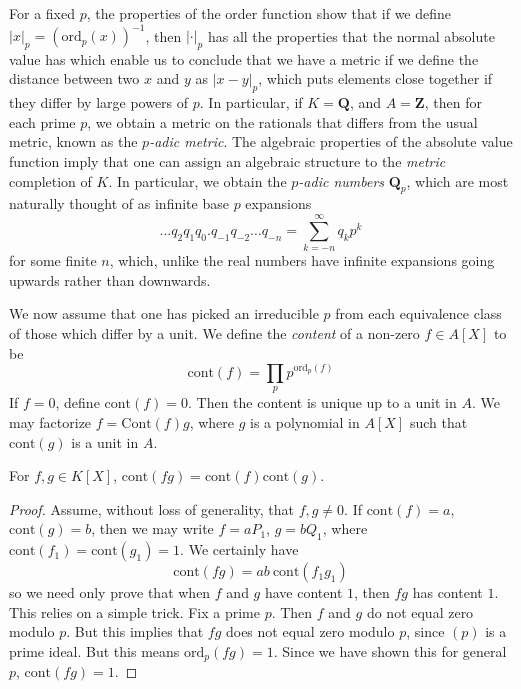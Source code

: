 \begin{remark}
	For a fixed $p$, the properties of the order function show that if we define $|x|_p = (\text{ord}_p(x))^{-1}$, then $|\cdot|_p$ has all the properties that the normal absolute value has which enable us to conclude that we have a metric if we define the distance between two $x$ and $y$ as $|x-y|_p$, which puts elements close together if they differ by large powers of $p$. In particular, if $K = \mathbf{Q}$, and $A = \mathbf{Z}$, then for each prime $p$, we obtain a metric on the rationals that differs from the usual metric, known as the {\it $p$-adic metric}. The algebraic properties of the absolute value function imply that one can assign an algebraic structure to the {\it metric} completion of $K$. In particular, we obtain the {\it $p$-adic numbers} $\mathbf{Q}_p$, which are most naturally thought of as infinite base $p$ expansions
	\[ \dots q_2 q_1 q_0. q_{-1} q_{-2} \dots q_{-n} = \sum_{k = -n}^\infty q_k p^k \]
	for some finite $n$, which, unlike the real numbers have infinite expansions going upwards rather than downwards.
\end{remark}

We now assume that one has picked an irreducible $p$ from each equivalence class of those which differ by a unit. We define the {\it content} of a non-zero $f \in A[X]$ to be
%
\[ \text{cont}(f) = \prod_p p^{\text{ord}_p(f)} \]
%
If $f = 0$, define $\text{cont}(f) = 0$. Then the content is unique up to a unit in $A$. We may factorize $f = \text{Cont}(f)g$, where $g$ is a polynomial in $A[X]$ such that $\text{cont}(g)$ is a unit in $A$.

\begin{lemma}[Gauss]
    For $f,g \in K[X]$, $\text{cont}(fg) = \text{cont}(f) \text{cont}(g)$.
\end{lemma}
\begin{proof}
    Assume, without loss of generality, that $f, g \neq 0$. If $\text{cont}(f) = a$, $\text{cont}(g) = b$, then we may write $f = a P_1$, $g = b Q_1$, where $\text{cont}(f_1) = \text{cont}(g_1) = 1$. We certainly have
    \[ \text{cont}(fg) = ab\ \text{cont}(f_1 g_1) \]
    so we need only prove that when $f$ and $g$ have content $1$, then $fg$ has content $1$. This relies on a simple trick. Fix a prime $p$. Then $f$ and $g$ do not equal zero modulo $p$. But this implies that $fg$ does not equal zero modulo $p$, since $(p)$ is a prime ideal. But this means $\text{ord}_p(fg) = 1$. Since we have shown this for general $p$, $\text{cont}(fg) = 1$.
\end{proof}

